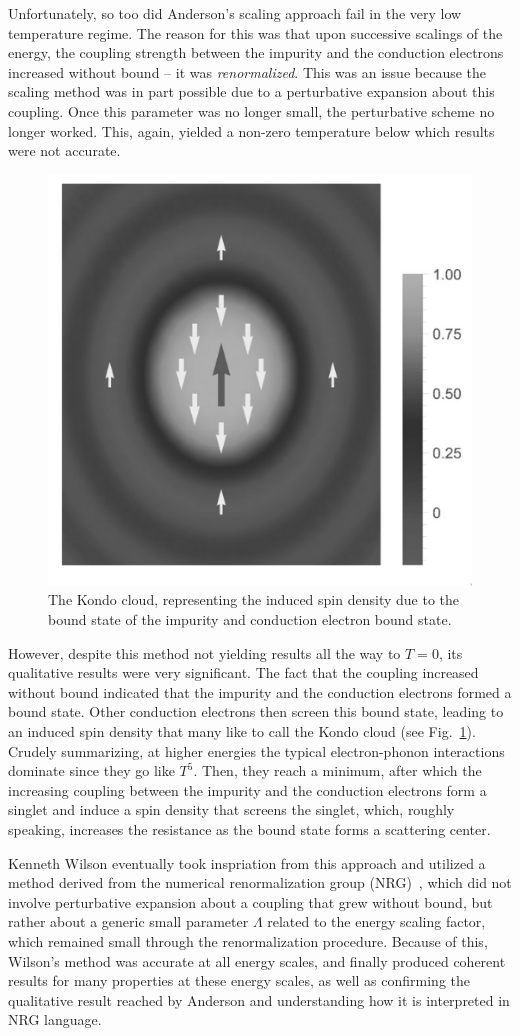 Unfortunately, so too did Anderson's scaling approach fail in the very low temperature regime. The reason for this was that upon successive scalings of the energy, the coupling strength between the impurity and the conduction electrons increased without bound -- it was \textit{renormalized}. This was an issue because the scaling method was in part possible due to a perturbative expansion about this coupling. Once this parameter was no longer small, the perturbative scheme no longer worked. This, again, yielded a non-zero temperature below which results were not accurate.

\begin{figure}[ht]
  \centering
  \includegraphics[width=0.35\linewidth]{../resources/gfx/kondo-cloud.png}
  \caption{The Kondo cloud, representing the induced spin density due to the bound state of the impurity and conduction electron bound state.}
  \label{fig:kondo-cloud}
\end{figure}

However, despite this method not yielding results all the way to $T=0$, its qualitative results were very significant. The fact that the coupling increased without bound indicated that the impurity and the conduction electrons formed a bound state. Other conduction electrons then screen this bound state, leading to an induced spin density that many like to call the Kondo cloud (see Fig.~\ref{fig:kondo-cloud}). Crudely summarizing, at higher energies the typical electron-phonon interactions dominate since they go like $T^5$. Then, they reach a minimum, after which the increasing coupling between the impurity and the conduction electrons form a singlet and induce a spin density that screens the singlet, which, roughly speaking, increases the resistance as the bound state forms a scattering center.

Kenneth Wilson eventually took inspriation from this approach and utilized a method derived from the numerical renormalization group (NRG)~\cite{Wilson_1975}, which did not involve perturbative expansion about a coupling that grew without bound, but rather about a generic small parameter $\Lambda$ related to the energy scaling factor, which remained small through the renormalization procedure. Because of this, Wilson's method was accurate at all energy scales, and finally produced coherent results for many properties at these energy scales, as well as confirming the qualitative result reached by Anderson and understanding how it is interpreted in NRG language.

